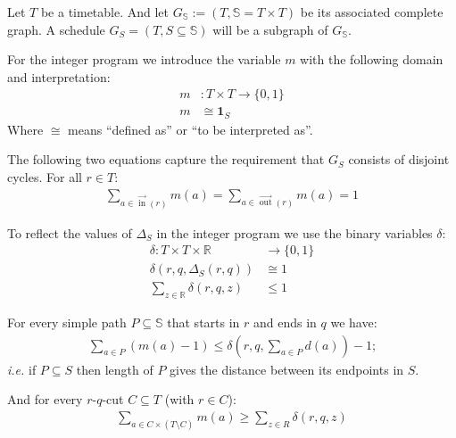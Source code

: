 \documentclass[a4paper]{amsart}
\theoremstyle{definition}
\def\ie{\emph{i.e.}}
\DeclareMathOperator{\In}{in}
\DeclareMathOperator{\Out}{out}
\newcommand{\ina}{\ensuremath{\vec{\In}}}
\newcommand{\outa}{\ensuremath{\vec{\Out}}}
\begin{document}
Let \(T\) be a timetable.  And let \(G_\mathbb{S} := (T, \mathbb{S} =
T \times T) \) be its associated complete graph.  A schedule \(G_S =
(T, S \subseteq \mathbb{S})\) will be a subgraph of \(G_\mathbb{S}\).


For the integer program we introduce the variable \(m\) with the
following domain and interpretation:
\begin{align}
  m & \colon T \times T \to \{0,1\} \\
  m & \cong \mathbf{1}_{S}
\end{align}
Where \(\cong\) means ``defined as'' or ``to be interpreted as''.

The following two equations capture the requirement that \(G_S\)
consists of disjoint cycles.  For all \(r \in T\):
\begin{align}
  \label{matchBedingung}
  \sum_{a \in \ina(r)}  m(a) = \sum_{a \in \outa(r)} m(a) = 1
\end{align}

To reflect the values of \(\Delta_S\) in the integer program we use the binary variables \(\delta\):
\begin{align}
  \delta \colon T \times T \times \mathbb{R} & \to \{0,1\} \\
  \delta\left(r, q, \Delta_S\left(r,q\right)\right) &\cong 1 \\
  \label{onlyOne}
  \sum_{z \in \mathbb{R}} \delta(r, q, z) &\leq 1
\end{align}

For every simple path \(P \subseteq \mathbb{S}\) that starts in \(r\) and ends in \(q\) we have:
\begin{align}
\label{zwingHoch}
\sum_{a \in P} (m(a) - 1) \leq \delta \left(r,q, \sum_{a \in P} d \left(a\right)\right) - 1 \textrm{;}
\end{align}
\ie{} if \(P \subseteq S\) then length of \(P\) gives
the distance between its endpoints in \(S\).

And for every \(r\)-\(q\)-cut \(C \subseteq T\) (with \(r \in C\)):
\begin{align}
\label{zwingRunter}
  \sum_{a \in C \times (T \setminus C)} m(a) \geq \sum_{z \in R} \delta (r,q, z)
\end{align}



\end{document}
